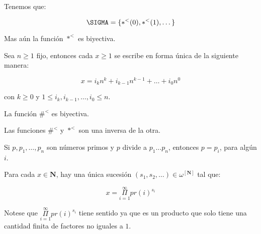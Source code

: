  \begin{lemma}
    \par Tenemos que:

    \[
      \SIGMA = \{\ast^{<}(0), \ast^{<}(1), \dotsc\}
    \]

    \par Mas aún la función $\ast^{<}$ es biyectiva.
  \end{lemma}

  \begin{lemma}
    \par Sea $n \geq 1$ fijo, entonces cada $x \geq 1$ se escribe en forma única de la siguiente manera:

    \[
      x = i_{k} n^{k} + i_{k-1} n^{k-1} + \dotsc + i_{0} n^{0}
    \]

    \par con $k\geq 0$ y $1 \leq i_{k}, i_{k-1}, \dotsc, i_{0} \leq n$.
  \end{lemma}

  \begin{lemma}
    \par La función $\#^{<}$ es biyectiva.
  \end{lemma}

  \begin{lemma}
    \par Las funciones $\#^{<}$ y $\ast^{<}$ son una inversa de la otra.
  \end{lemma}

  \begin{lemma}
    \par Si $p, p_{1}, \dotsc, p_{n}$ son números primos y $p$ divide a $p_{1} \dotsc p_{n}$, entonces $p = p_{i}$,
    para algún $i$.
  \end{lemma}

  \begin{theorem}
    \par Para cada $x \in \mathbf{N}$, hay una única sucesión $(s_{1}, s_{2}, \dotsc) \in
    \omega^{\left[\mathbf{N}\right]}$ tal que:

    \[
      x = \underset{i=1}{\overset{\infty}{\Pi}} pr(i)^{s_{i}}
    \]

    \par Notese que $\underset{i=1}{\overset{\infty}{\Pi}} pr(i)^{s_{i}}$ tiene sentido ya que es un producto que solo
    tiene una cantidad finita de factores no iguales a $1$.
  \end{theorem}

